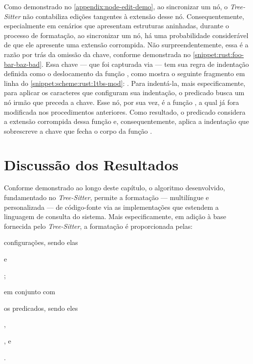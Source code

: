 \documentclass
  [11pt,a4paper,english,brazil,openright,sumario=tradicional,twoside]
  {abntex2}
\newcommand{\treesitter}{\textit{Tree-Sitter}\xspace}
\begin{document}
  Como demonstrado no \cref{appendix:node-edit-demo}, ao sincronizar um nó, o
  \treesitter não contabiliza edições tangentes à extensão desse nó.
  Consequentemente, especialmente em cenários que apresentam estruturas
  aninhadas, durante o processo de formatação, ao sincronizar um nó, há uma
  probabilidade considerável de que ele apresente uma extensão corrompida. Não
  surpreendentemente, essa é a razão por trás da omissão da chave, conforme
  demonstrada no \cref{snippet:rust:foo-bar-baz-bad}. Essa chave --- que foi
  capturada via  --- tem sua regra de indentação
  definida como o deslocamento da função , como mostra o
  seguinte fragmento em linha do \cref{snippet:scheme:rust:1tbs-mod}:
  . Para indentá-la,
  mais especificamente, para aplicar os caracteres que configuram sua
  indentação, o predicado  busca um nó irmão que
  preceda a chave. Esse nó, por sua vez, é a função , a
  qual já fora modificada nos procedimentos anteriores. Como resultado, o
  predicado considera a extensão corrompida dessa função e, consequentemente,
  aplica a indentação que sobrescreve a chave que fecha o corpo da função
  .


  \section{Discussão dos Resultados}

  Conforme demonstrado ao longo deste capítulo, o algoritmo desenvolvido,
  fundamentado no \treesitter, permite a formatação --- multilíngue e
  personalizada --- de código-fonte via as implementações que estendem a
  linguagem de consulta do sistema. Mais especificamente, em adição à base
  fornecida pelo \treesitter, a formatação é proporcionada pelas:
  \begin{inparaenum}
    \item configurações, sendo elas
          \begin{inparaenum}
            \item {} e
            \item {};
          \end{inparaenum}
          em conjunto com
    \item os predicados, sendo eles
          \begin{inparaenum}
            \item {},
            \item {}, e
            \item {}.
          \end{inparaenum}
  \end{inparaenum}
\end{document}
